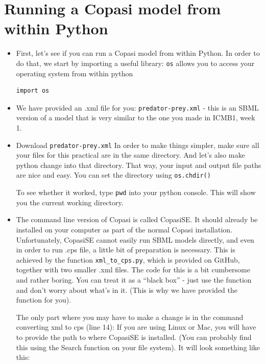 \documentclass[pdflatex,a4paper]{article}
\begin{document}
\section{Running a Copasi model from within Python}

\begin{itemize}

\item
First, let's see if you can run a Copasi model from within Python. In order to do that, we start by importing a useful library: \verb=os= allows you to access your operating system from within python

\begin{lstlisting}
import os
\end{lstlisting}

\item

We have provided an .xml file for you:  \verb=predator-prey.xml= - this is an SBML version of a model that is very similar to the one you made in ICMB1, week 1.   

\item 
Download \verb=predator-prey.xml=  In order to make things simpler, make sure all your files for this practical are in the same directory. And let's also make python change into that directory. That way, your input and output file paths are nice and easy. You can set the directory using \verb=os.chdir()= 

To see whether it worked, type \verb=pwd= into your python console. This will show you the current working directory. 

\item

The command line version of Copasi is called CopasiSE. It should already be installed on your computer as part of the normal Copasi installation. Unfortunately, CopasiSE cannot easily run SBML models directly, and even in order to run .cps file, a little bit of preparation is necessary. This is achieved by the function \verb=xml_to_cps.py=, which is provided on GitHub, together with two smaller .xml files.  The code for this is a bit cumbersome and rather boring. You can treat it as a ``black box'' - just use the function and don't worry about what's in it. (This is why we have provided the function for you). 

The only part where you may have to make a change is in the command converting xml to cps (line 14): If you are using Linux or Mac, you will have to provide the path to where CopasiSE is installed. (You can probably find this using the Search function on your file system). It will look something like this:


\end{itemize}
\end{document}

